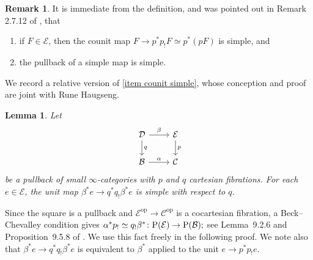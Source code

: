 \documentclass{amsart}
\numberwithin{theorem}{subsection}
\newtheorem{lemma}[theorem]{Lemma}
\theoremstyle{definition}
\newtheorem{remark}[theorem]{Remark}
\providecommand{\op}{\mathrm{op}}
\newcommand{\xE}{\mathcal{E}}
\newcommand{\xcc}{\mathcal{C}}
\newcommand{\Pre}{\name{P}}
\newcommand{\name}[1]{\ensuremath{\text{\textup{#1}}}}
\begin{document}
\begin{remark}\label{remark first simple properties}
It is immediate from the definition, and was pointed out in Remark 2.7.12 of \cite{ChuHaugseng}, that
\begin{enumerate}
\item if $F\in \xE$, then the counit map $F \to p^*p_! F \simeq p^*(pF)$ is simple, and \label{item counit simple}
\item the pullback of a simple map is simple. \label{item pullback simple}
\end{enumerate}
\end{remark}

We record a relative version of \eqref{item counit simple}, whose conception and proof are joint with Rune Haugseng.
\begin{lemma}\label{lemma: relative simple unit}
Let
\begin{equation}\label{eq pullback DEBC} \begin{tikzcd}
\mathcal{D} \rar{\beta} \dar{q} & \xE \dar{p} \\
\mathcal{B} \rar{\alpha} & \xcc
\end{tikzcd} \end{equation}
be a pullback of small $\infty$-categories with $p$ and $q$ cartesian fibrations.
For each $e\in \xE$, the unit map $\beta^*e \to q^*q_!\beta^*e$ is simple with respect to $q$.
\end{lemma}
Since the square is a pullback and $\xE^\op \to \xcc^\op$ is a cocartesian fibration, a Beck--Chevalley condition gives 
$
\alpha^* p_! \simeq q_! \beta^* \colon \Pre(\xE) \to \Pre(\mathcal{B});	
$
see Lemma~9.2.6 and Proposition~9.5.8 of \cite{RiehlVerity:EICT}.
We use this fact freely in the following proof.
We note also that $\beta^*e\to q^*q_! \beta^*e$ is equivalent to $\beta^*$ applied to the unit $e \to p^*p_!e$.
\end{document}
